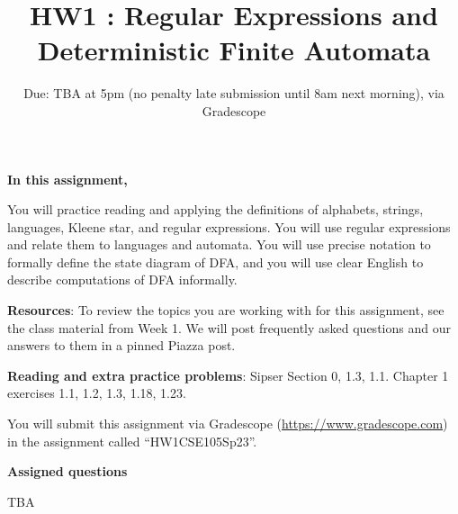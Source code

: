 

\title{HW1 : Regular Expressions and Deterministic Finite Automata}
\date{Due: TBA at 5pm (no penalty late submission until 8am next morning), via Gradescope}



\maketitle
\thispagestyle{fancy}


{\bf In this assignment,}

You will practice reading and
applying the definitions of alphabets, strings, languages, Kleene star, and regular expressions.
You will use regular expressions and relate them to languages and automata.
You will use precise notation to formally define the state diagram of DFA,
and you will use clear English to describe computations of DFA informally.


{\bf Resources}: To review the topics you are working with 
for this assignment, see the class material from Week 1.
We will post frequently asked questions and our answers to them in a 
pinned Piazza post.

{\bf Reading and extra practice problems}: Sipser Section 0, 1.3, 1.1.
Chapter 1 exercises 1.1, 1.2, 1.3, 1.18, 1.23.

\instructions

You will submit this assignment via Gradescope
(\href{https://www.gradescope.com}{https://www.gradescope.com}) 
in the assignment called ``HW1CSE105Sp23''.



{\bf Assigned questions}

TBA

